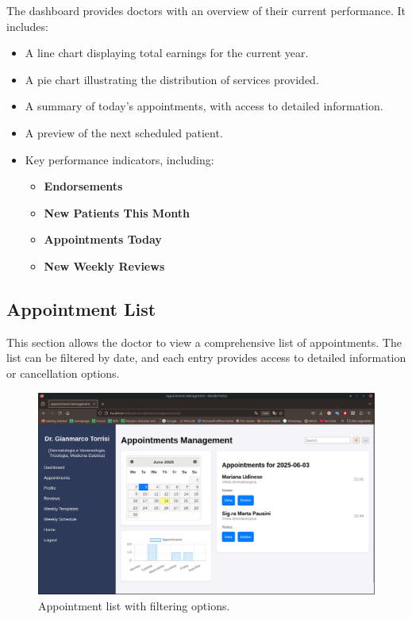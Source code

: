 The dashboard provides doctors with an overview of their current performance. It includes:
\begin{itemize}
    \item A line chart displaying total earnings for the current year.
    \item A pie chart illustrating the distribution of services provided.
    \item A summary of today's appointments, with access to detailed information.
    \item A preview of the next scheduled patient.
    \item Key performance indicators, including:
    \begin{itemize}
        \item \textbf{Endorsements}
        \item \textbf{New Patients This Month}
        \item \textbf{Appointments Today}
        \item \textbf{New Weekly Reviews}
    \end{itemize}
\end{itemize}

\subsection{Appointment List}
This section allows the doctor to view a comprehensive list of appointments. The list can be filtered by date, and each entry provides access to detailed information or cancellation options.

\begin{figure}[!h]
    \centering
    \includegraphics[scale=0.30]{resources/screenshots/doctor_ui/appointments.png}
    \caption{Appointment list with filtering options.}
    \label{fig:appointment_list}
\end{figure}

